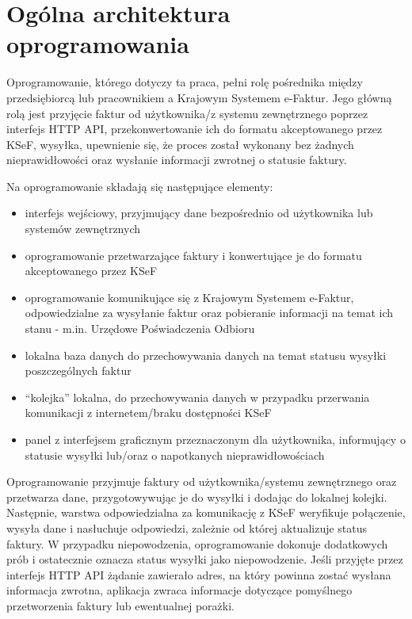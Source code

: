 \section{Ogólna architektura oprogramowania}
Oprogramowanie, którego dotyczy ta praca, pełni rolę pośrednika między przedsiębiorcą lub pracownikiem a Krajowym Systemem e-Faktur. Jego główną rolą jest przyjęcie faktur od użytkownika/z systemu zewnętrznego poprzez interfejs HTTP API, przekonwertowanie ich do formatu akceptowanego przez KSeF, wysyłka, upewnienie się, że proces został wykonany bez żadnych nieprawidłowości oraz wysłanie informacji zwrotnej o statusie faktury.
\par
Na oprogramowanie składają się następujące elementy:
\begin{itemize}
    \item interfejs wejściowy, przyjmujący dane bezpośrednio od użytkownika lub systemów zewnętrznych
    \item oprogramowanie przetwarzające faktury i konwertujące je do formatu akceptowanego przez KSeF
    \item oprogramowanie komunikujące się z Krajowym Systemem e-Faktur, odpowiedzialne za wysyłanie faktur oraz pobieranie informacji na temat ich stanu - m.in. Urzędowe Poświadczenia Odbioru
    \item lokalna baza danych do przechowywania danych na temat statusu wysyłki poszczególnych faktur
    \item \enquote{kolejka} lokalna, do przechowywania danych w przypadku przerwania komunikacji z internetem/braku dostępności KSeF 
    \item panel z interfejsem graficznym przeznaczonym dla użytkownika, informujący o statusie wysyłki lub/oraz o napotkanych nieprawidłowościach
\end{itemize}

Oprogramowanie przyjmuje faktury od użytkownika/systemu zewnętrznego oraz przetwarza dane, przygotowywując je do wysyłki i dodając do lokalnej kolejki. Następnie, warstwa odpowiedzialna za komunikację z KSeF weryfikuje połączenie, wysyła dane i nasłuchuje odpowiedzi, zależnie od której aktualizuje status faktury. W przypadku niepowodzenia, oprogramowanie dokonuje dodatkowych prób i ostatecznie oznacza status wysyłki jako niepowodzenie. Jeśli przyjęte przez interfejs HTTP API żądanie zawierało adres, na który powinna zostać wysłana informacja zwrotna, aplikacja zwraca informacje dotyczące pomyślnego przetworzenia faktury lub ewentualnej porażki.
